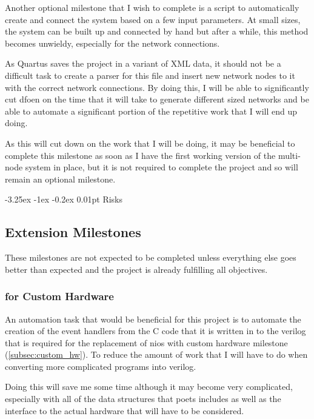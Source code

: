 \documentclass[paper=a4, fontsize=11pt, bibliography=totocnumbered]{scrartcl}
\makeatletter
\renewcommand\paragraph{\@startsection{paragraph}{4}{\z@}%
  {-3.25ex \@plus -1ex \@minus -0.2ex}%
  {0.01pt}%
  {\raggedsection\normalfont\sectfont\nobreak\size@paragraph}%
}
\numberwithin{equation}{section}		%
\numberwithin{figure}{section}			%
\numberwithin{table}{section}				%
\makeatother
\begin{document}
Another optional milestone that I wish to complete is a script to automatically create and connect the system based on a few input parameters. At small sizes, the system can be built up and connected by hand but after a while, this method becomes unwieldy, especially for the network connections.

As Quartus saves the project in a variant of XML data, it should not be a difficult task to create a parser for this file and insert new \glspl{network node} to it with the correct network connections. By doing this, I will be able to significantly cut dfoen on the time that it will take to generate different sized networks and be able to automate a significant portion of the repetitive work that I will end up doing.

As this will cut down on the work that I will be doing, it may be beneficial to complete this milestone as soon as I have the first working version of the multi-node system in place, but it is not required to complete the project and so will remain an optional milestone.

\paragraph{Risks}

\subsection{Extension Milestones}

These milestones are not expected to be completed unless everything else goes better than expected and the project is already fulfilling all objectives.

\subsubsection{ for Custom Hardware}

An automation task that would be beneficial for this project is to automate the creation of the event handlers from the C code that it is written in to the verilog that is required for the replacement of \gls{nios} with custom hardware milestone (\cref{subsec:custom_hw}). To reduce the amount of work that I will have to do when converting more complicated programs into verilog.

Doing this will save me some time although it may become very complicated, especially with all of the data structures that \gls{poets} includes as well as the interface to the actual hardware that will have to be considered.
\end{document}
